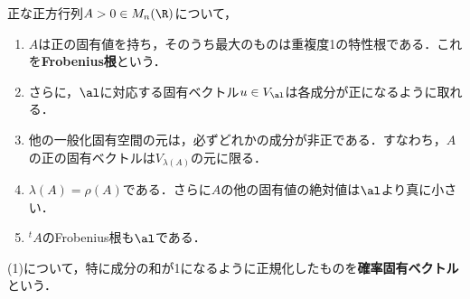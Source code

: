 \documentclass[uplatex, dvipdfmx]{jsreport}
\begin{document}
\begin{theorem}
    正な正方行列$A>0\in M_n(\R)$について，
    \begin{enumerate}
        \item $A$は正の固有値を持ち，そのうち最大のものは重複度1の特性根である．これを\textbf{Frobenius根}という．
        \item さらに，$\al$に対応する固有ベクトル$u\in V_\al$は各成分が正になるように取れる．
        \item 他の一般化固有空間の元は，必ずどれかの成分が非正である．すなわち，$A$の正の固有ベクトルは$V_{\lambda(A)}$の元に限る．
        \item $\lambda(A)=\rho(A)$である．さらに$A$の他の固有値の絶対値は$\al$より真に小さい．
        \item ${}^t\!A$のFrobenius根も$\al$である．
    \end{enumerate}
    (1)について，特に成分の和が1になるように正規化したものを\textbf{確率固有ベクトル}という．
\end{theorem}
\end{document}
